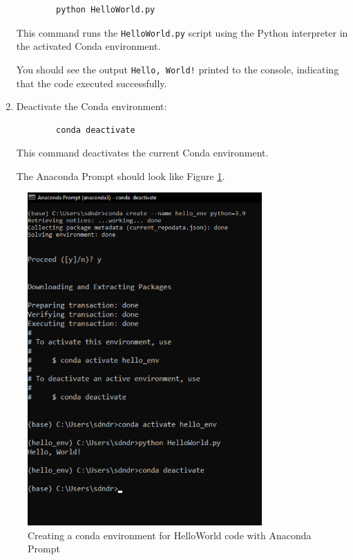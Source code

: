 \begin{enumerate}
	\begin{verbatim}
		python HelloWorld.py
	\end{verbatim}
	
	This command runs the \texttt{HelloWorld.py} script using the Python interpreter in the activated Conda environment.
	
	You should see the output \texttt{Hello, World!} printed to the console, indicating that the code executed successfully.
	
	\item Deactivate the Conda environment:
	
	\begin{verbatim}
		conda deactivate
	\end{verbatim}
	
	This command deactivates the current Conda environment.
	
	The Anaconda Prompt should look like Figure \ref{fig:EnvCondaPrompt}.
\end{enumerate}

\begin{center}
	\begin{figure}[h!]
		\begin{center}
			\includegraphics[width=0.8\textwidth]{Images/DevelopmentEnv/DevEnvCondaPrompt}
		\end{center}
		\caption{Creating a conda environment for HelloWorld code with Anaconda Prompt}
		\label{fig:EnvCondaPrompt}
	\end{figure}
\end{center}

